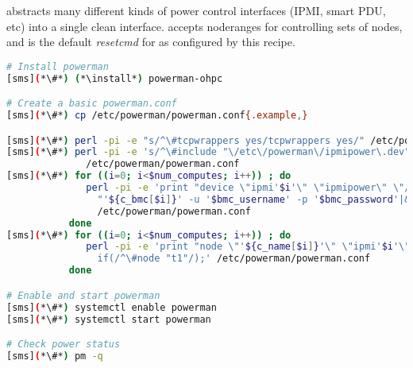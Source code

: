 \powerman{} abstracts many different kinds of power control interfaces (IPMI, 
smart PDU, etc) into a single clean interface. \powerman{} accepts noderanges
for controlling sets of nodes, and is the default {\em resetcmd} for \conman{}
as configured by this recipe.

\begin{lstlisting}[language=bash,keywords={},upquote=true]
# Install powerman
[sms](*\#*) (*\install*) powerman-ohpc

# Create a basic powerman.conf
[sms](*\#*) cp /etc/powerman/powerman.conf{.example,}

[sms](*\#*) perl -pi -e "s/^\#tcpwrappers yes/tcpwrappers yes/" /etc/powerman/powerman.conf
[sms](*\#*) perl -pi -e 's/^\#include "\/etc\/powerman\/ipmipower\.dev"/include "\/etc\/powerman\/ipmipower.dev"/' \
              /etc/powerman/powerman.conf
[sms](*\#*) for ((i=0; i<$num_computes; i++)) ; do
              perl -pi -e 'print "device \"ipmi'$i'\" \"ipmipower\" \"/usr/sbin/ipmipower -h ".
                "'${c_bmc[$i]}' -u '$bmc_username' -p '$bmc_password'|&\"\n" if(/^\#device "ipmi1"/);' \
                /etc/powerman/powerman.conf
           done
[sms](*\#*) for ((i=0; i<$num_computes; i++)) ; do
              perl -pi -e 'print "node \"'${c_name[$i]}'\" \"ipmi'$i'\" \"'${c_bmc[$i]}'\"\n"
                if(/^\#node "t1"/);' /etc/powerman/powerman.conf
           done

# Enable and start powerman
[sms](*\#*) systemctl enable powerman
[sms](*\#*) systemctl start powerman

# Check power status
[sms](*\#*) pm -q
\end{lstlisting}

